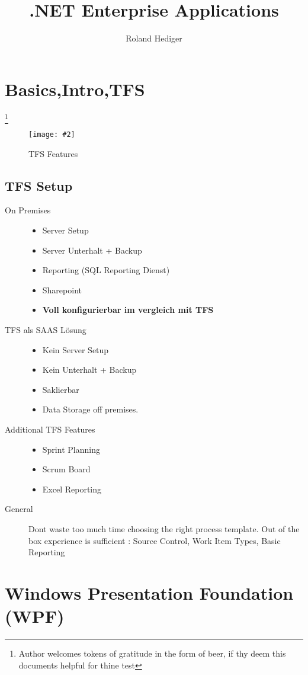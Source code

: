 \documentclass[a4paper,10pt]{scrreprt}
\title{.NET Enterprise Applications}
\author{Roland Hediger}
\newcommand{\pic}[2][figure]{\begin{figure}[h]
 \centering
 \texttt{[image: \#2]}
 \caption{#1}
\end{figure}
}
\begin{document}
\maketitle
\tableofcontents
\newpage
 \pagestyle{fancy}


\chapter{Basics,Intro,TFS}
\footnote{Author welcomes tokens of gratitude in the form of beer, if thy deem this documents helpful for thine test}
\pic[TFS Features]{tfs.png}
\section{TFS Setup}
\begin{description}
\item[On Premises] \begin{itemize}
\item Server Setup
\item Server Unterhalt + Backup
\item Reporting (SQL Reporting Dienst)
\item Sharepoint
\item \textbf{Voll konfigurierbar im vergleich mit TFS}
\end{itemize}
\item[TFS als SAAS Lösung]
\begin{itemize}
\item Kein Server Setup
\item Kein Unterhalt + Backup
\item Saklierbar
\item Data Storage off premises.
\end{itemize}
\item[Additional TFS Features]
\begin{itemize}
\item Sprint Planning
\item Scrum Board
\item Excel Reporting
\end{itemize}
\item [General] Dont waste too much time choosing the right process template. Out of the box experience is sufficient : Source Control, Work Item Types, Basic Reporting
\end{description}

\chapter{Windows Presentation Foundation (WPF)}
\end{document}
